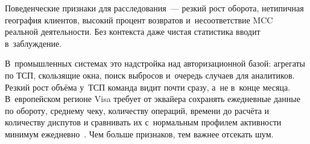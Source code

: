 Поведенческие признаки для расследования~---
резкий рост оборота, нетипичная география клиентов, высокий процент
возвратов и~несоответствие MCC реальной деятельности. Без контекста даже чистая статистика вводит
в~заблуждение.

В~промышленных системах это надстройка над авторизационной базой:
агрегаты по ТСП, скользящие окна, поиск выбросов и~очередь случаев
для аналитиков. Резкий рост объёма у~ТСП команда видит почти сразу,
а~не в~конце месяца. В~европейском регионе Visa требует от эквайера
сохранять ежедневные данные по обороту, среднему чеку, количеству
операций, времени до расчёта и количеству диспутов и сравнивать их
с~нормальным профилем активности минимум ежедневно~\cite{visa-core-rules}.
Чем больше признаков, тем важнее отсекать шум.
